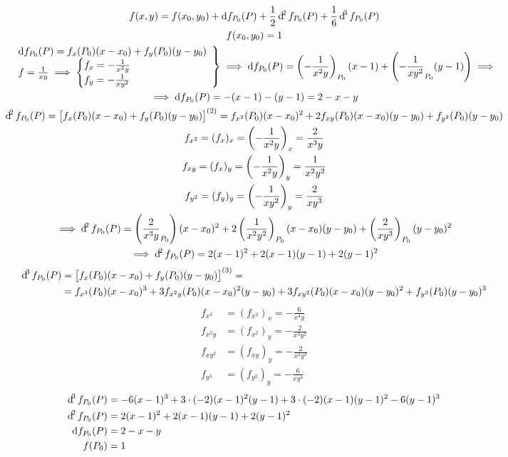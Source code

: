 \documentclass[11pt,a4paper,titlepage,draft]{article}
\begin{document}
\begin{gather*}
f(x,y) = f(x_0,y_0) + \dif f_{P_0}(P) + \frac{1}{2}\dif^2 f_{P_0}(P) + \frac{1}{6} \dif^3 f_{P_0}(P) \\
f(x_0,y_0) = 1 \\ \left.
\begin{array}{l}
\dif f_{P_0}(P)=f_x(P_0)(x-x_0)+f_y(P_0)(y-y_0) \\
f=\frac{1}{xy} \implies \begin{cases}
f_x = -\frac{1}{x^2y} \\ f_y = -\frac{1}{xy^2}
\end{cases}
\end{array} \right\rbrace \implies
\dif f_{P_0}(P)= \left(-\frac{1}{x^2y} \right)_{P_0}(x-1) + \left(
-\frac{1}{xy^2}_{P_0}(y-1)
\right) \implies \\
\implies \dif f_{P_0}(P) = -(x-1)-(y-1) = 2-x-y\\
\dif^2f_{P_0}(P) = \left[
f_x(P_0)(x-x_0)+f_y(P_0)(y-y_0)
\right]^{(2)} =
f_{x^2}(P_0)(x-x_0)^2+2f_{xy}(P_0)(x-x_0)(y-y_0)+f_{y^2}(P_0)(y-y_0) \\
f_{x^2} = (f_x)_x = \left(-\frac{1}{x^2y} \right)_x = \frac{2}{x^3y} \\
f_{xy} = (f_x)_y = \left(-\frac{1}{x^2y} \right)_y = \frac{1}{x^2y^2} \\
f_{y^2} = (f_y)_y = \left(-\frac{1}{xy^2} \right)_y = \frac{2}{xy^3} \\
\implies \dif^2 f_{P_0}(P) = \left(
\frac{2}{x^3y}_{P_0}\right)(x-x_0)^2+2\left(
\frac{1}{x^2y^2}\right)_{P_0}(x-x_0)(y-y_0)+\left(
\frac{2}{xy^3}
\right)_{P_0}(y-y_0)^2 \\
\implies \dif^2 f_{P_0}(P) = 2(x-1)^2+2(x-1)(y-1)+2(y-1)^2
\end{gather*}
\begin{align*}
\dif^3 f_{P_0}(P) &= \left[
f_x(P_0)(x-x_0)+f_y(P_0)(y-y_0)
\right]^{(3)} = \\
&= f_{x^3}(P_0)(x-x_0)^3+3f_{x^2y}(P_0)(x-x_0)^2(y-y_0)+3f_{xy^2}(P_0)(x-x_0)(y-y_0)^2 + f_{y^3}(P_0)(y-y_0)^3
\end{align*}
\begin{align*}
f_{x^3} &= (f_{x^2})_x = -\frac{6}{x^4y}\\
f_{x^2y} &= (f_{x^2})_y = -\frac{2}{x^3y^2}\\
f_{xy^2} &= (f_{xy})_y = -\frac{2}{x^2y^3}\\
f_{y^3} &= (f_{y^2})_y = -\frac{6}{xy^4}
\end{align*}
\begin{align*}
\dif^3 f_{P_0}(P) &= -6(x-1)^3+3\cdot(-2)(x-1)^2(y-1) + 3\cdot(-2)(x-1)(y-1)^2-6(y-1)^3\\
\dif^2 f_{P_0}(P) &= 2(x-1)^2+2(x-1)(y-1)+2(y-1)^2 \\
\dif f_{P_0}(P)   &= 2-x-y \\
f(P_0) &= 1
\end{align*}
\end{document}
